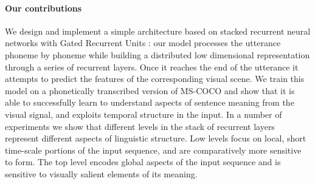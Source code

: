 \paragraph{Our contributions}

We design and implement a simple architecture based on stacked
recurrent neural networks with Gated Recurrent Units
\cite{chung2014empirical}: our model processes the utterance phoneme
by phoneme while building a distributed low dimensional representation
through a series of recurrent layers. Once it reaches the end of the
utterance it attempts to predict the features of the corresponding
visual scene. We train this model on a phonetically transcribed
version of MS-COCO \cite{lin2014microsoft} and show that it is able to
successfully learn to understand aspects of sentence meaning from the
visual signal, and exploits temporal structure in the input. In a
number of experiments we show that different levels in the stack of
recurrent layers represent different aspects of linguistic
structure. Low levels focus on local, short time-scale portions of the
input sequence, and are comparatively more sensitive to form. The top
level encodes global aspects of the input sequence and is sensitive to
visually salient elements of its meaning.
